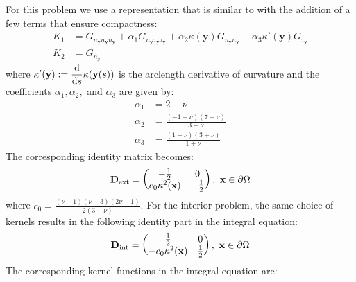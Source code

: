 \documentclass[preprint,12pt,3p]{elsarticle}
\newcommand{\dd}{ {\rm d} }
\begin{document}
For this problem we use a representation that is similar to \cite{farkas} with the addition of a few terms that ensure compactness:
\begin{align}
    K_{1} &= G_{n_\mathbf{y} n_\mathbf{y} n_\mathbf{y}}   + \alpha_1 G_{n_\mathbf{y} \tau_\mathbf{y} \tau_\mathbf{y}}  +  \alpha_2 \kappa(\mathbf{y}) G_{n_\mathbf{y} n_\mathbf{y} } + \alpha_3 \kappa'(\mathbf{y}) G_{\tau_\mathbf{y} }  \\
    K_{2} &= G_{n_{\mathbf{y}}}
\end{align}
where $\kappa'(\mathbf{y}) := \displaystyle \frac{\dd}{\dd s} \kappa(\mathbf{y}(s))$ is the arclength derivative of curvature and the coefficients $\alpha_1, \alpha_2,$ and $ \alpha_3$ are given by:
\begin{align}
    \alpha_1 &= 2-\nu \\
    \alpha_2 &= \frac{(-1+\nu)(7+\nu)}{3-\nu} \\
    \alpha_3 &= \frac{(1-\nu)(3+\nu)}{1+\nu} 
\end{align}
The corresponding identity matrix becomes:
\begin{align}
    \mathbf{D}_{\rm ext} = \begin{pmatrix}
         -\frac{1}{2}    &  0\\  c_0 \kappa^2(\mathbf{x})  & -\frac{1}{2} 
    \end{pmatrix}  \label{support_id} , \ \mathbf{x}\in \partial \Omega
\end{align}
where $c_0 = \displaystyle \frac{(\nu -1) (\nu +3) (2 \nu -1)}{2 (3-\nu)}$. For the interior problem, the same choice of kernels results in the following identity part in the integral equation: 
\begin{align}
    \mathbf{D}_{\rm int} = \begin{pmatrix}
         \frac{1}{2}    &  0\\  -c_0 \kappa^2(\mathbf{x})  & \frac{1}{2} 
    \end{pmatrix}  , \ \mathbf{x}\in \partial \Omega
\end{align}
The corresponding kernel functions in the integral equation are:
\end{document}
